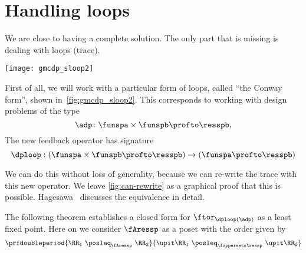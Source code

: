 
\section{Handling loops}

We are close to having a complete solution.
The only part that is missing is dealing with loops (trace).

\begin{marginfigure}
    \texttt{[image: gmcdp\_sloop2]}
    \caption{}
    \label{fig:gmcdp_sloop2}
\end{marginfigure}

First of all, we will work with a particular form of loops, called ``the Conway form'',
shown in~\cref{fig:gmcdp_sloop2}.
This corresponds to working with design problems of the type
\begin{equation}
    \adp \colon \funspa \times \funspb  \profto \resspb,
\end{equation}
The new feedback operator has signature
\begin{equation}
    \dploop: (\funspa \times \funspb \profto \resspb) \to (\funspa \profto \resspb)
\end{equation}

We can do this without loss of generality, because we can re-write the trace
with this new operator.
We leave \cref{fig:can-rewrite} as a graphical proof that this is possible.
Hagesawa~\cite{hasegawa02uniformity} discusses the equivalence in detail.

\begin{figure*}[h]
    \hspace*{\fill}
    \hspace*{\fill}
    \hspace*{\fill}
    \caption{We can rewrite the trace in Conway's form.}
    \label{fig:can-rewrite}
\end{figure*}

The following theorem establishes a closed form for $\ftor_{\dploop(\adp)}$
as a least fixed point.
Here on we consider $\fAressp$ as a poset with the order given by
\begin{equation}
    \prfdoubleperiod{
        \RR_1 \  \posleq_{\fAressp} \ \RR_2
    }{
        \upit \RR_1 \ \posleq_{\fuppersets \ressp}\  \upit \RR_2
    }
\end{equation}

